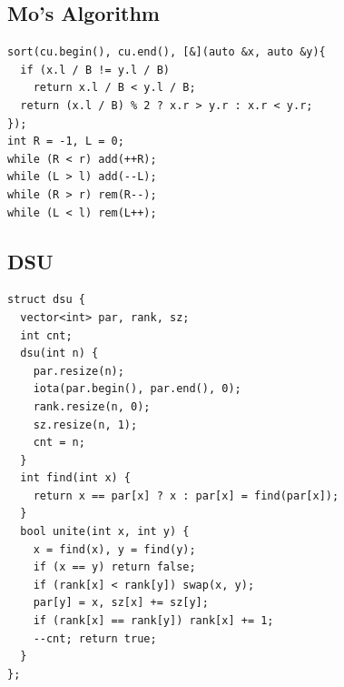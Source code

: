 \subsection{Mo's Algorithm}
\begin{verbatim}
sort(cu.begin(), cu.end(), [&](auto &x, auto &y){
  if (x.l / B != y.l / B)
    return x.l / B < y.l / B;
  return (x.l / B) % 2 ? x.r > y.r : x.r < y.r;
});
int R = -1, L = 0;
while (R < r) add(++R);
while (L > l) add(--L);
while (R > r) rem(R--);
while (L < l) rem(L++);
\end{verbatim}
\subsection{DSU}
\begin{verbatim}
struct dsu {
  vector<int> par, rank, sz;
  int cnt;
  dsu(int n) {
    par.resize(n);
    iota(par.begin(), par.end(), 0);
    rank.resize(n, 0);
    sz.resize(n, 1);
    cnt = n;
  }
  int find(int x) {
    return x == par[x] ? x : par[x] = find(par[x]);
  }
  bool unite(int x, int y) {
    x = find(x), y = find(y);
    if (x == y) return false;
    if (rank[x] < rank[y]) swap(x, y);
    par[y] = x, sz[x] += sz[y];
    if (rank[x] == rank[y]) rank[x] += 1;
    --cnt; return true;
  }
};
\end{verbatim}
